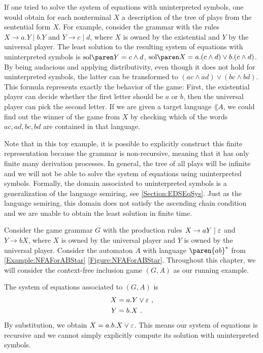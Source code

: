 \documentclass[../../diss.tex]{subfiles}
\begin{document}
If one tried to solve the system of equations with uninterpreted symbols, one would obtain for each nonterminal $X$ a description of the tree of plays from the sentential form $X$.
For example, consider the grammar with the rules $X \to a.Y \mid b.Y$ and $Y \to c \mid d$, where $X$ is owned by the existential and $Y$ by the universal player.
The least solution to the resulting system of equations with uninterpreted symbols is $\sol{Y} = c \wedge d$, $\sol{X} = a.(c \wedge d) \vee b.(c \wedge d)$.
By being audacious and applying distributivity, even though it does not hold for uninterpreted symbols, the latter can be transformed to $(ac \wedge ad) \vee (bc \wedge bd)$.
This formula represents exactly the behavior of the game:
First, the existential player can decide whether the first letter should be $a$ or $b$, then the universal player can pick the second letter.
If we are given a target language $\lang{A}$, we could find out the winner of the game from $X$ by checking which of the words $ac,ad,bc,bd$ are contained in that language.

Note that in this toy example, it is possible to explicitly construct this finite representation because the grammar is non-recursive, meaning that it has only finite many derivation processes.
In general, the tree of all plays will be infinite and we will not be able to solve the system of equations using uninterpreted symbols.
Formally, the domain associated to uninterpreted symbols is a generalization of the language semiring, see \cref{Section:EDSEqSys}.
Just as the language semiring, this domain does not satisfy the ascending chain condition and we are unable to obtain the least solution in finite time.

\begin{example}%
\label{Example:CFGamesOne}%
    Consider the game grammar $G$ with the production rules $X \to aY \mid \varepsilon$ and $Y \to bX$, where $X$ is owned by the universal player and $Y$ is owned by the universal player.
    Consider the automaton $A$ with language $\paren{ab}^*$ from \cref{Example:NFAForABStar} \resp \cref{Figure:NFAForABStar}.
    Throughout this chapter, we will consider the context-free inclusion game $(G,A)$ as our running example.

    The system of equations associated to $(G,A)$ is
    \begin{align*}
        X &= a.Y \vee \varepsilon
        \ ,
        \\
        Y &= b.X
        \ .
    \end{align*}
    By substitution, we obtain $X = a.b.X \vee \varepsilon$.
    This means our system of equations is recursive and we cannot simply explicitly compute its solution with uninterpreted symbols.
\end{example}
\end{document}
